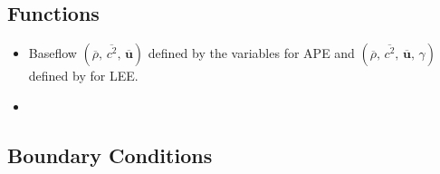 \subsection{Functions}
\begin{itemize}
\item {} Baseflow $(\overline{\rho},\,\overline{c^2},\,\overline{\boldsymbol{u}})$ defined by the variables  for APE and $(\overline{\rho},\,\overline{c^2},\,\overline{\boldsymbol{u}},\,\gamma)$ defined by  for LEE.
\item {}
\end{itemize}


\subsection{Boundary Conditions}

